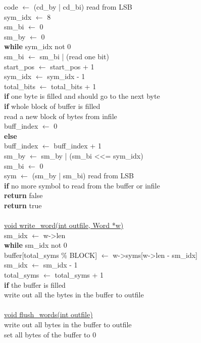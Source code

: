 \documentclass[12pt]{article}
\begin{document}
\indent *code $\leftarrow$ (cd\_by | cd\_bi) read from LSB \\
\indent sym\_idx $\leftarrow$ 8 \\
\indent sm\_bi $\leftarrow$ 0 \\
\indent sm\_by $\leftarrow$ 0 \\
\indent \textbf{while} sym\_idx not 0 \\
\indent \indent sm\_bi $\leftarrow$ sm\_bi | (read one bit) \\
\indent \indent start\_pos $\leftarrow$ start\_pos + 1 \\
\indent \indent sym\_idx $\leftarrow$ sym\_idx - 1 \\
\indent \indent total\_bits $\leftarrow$ total\_bits + 1 \\
\indent \indent \textbf{if} one byte is filled and should go to the next byte \\
\indent \indent \indent \textbf{if} whole block of buffer is filled \\
\indent \indent \indent \indent read a new block of bytes from infile \\
\indent \indent \indent \indent buff\_index $\leftarrow$ 0 \\
\indent \indent \indent \textbf{else} \\
\indent \indent \indent \indent buff\_index $\leftarrow$ buff\_index + 1 \\
\indent \indent \indent sm\_by $\leftarrow$ sm\_by | (sm\_bi <<= sym\_idx) \\
\indent \indent \indent sm\_bi $\leftarrow$ 0 \\
\indent *sym $\leftarrow$ (sm\_by | sm\_bi) read from LSB \\
\indent \textbf{if} no more symbol to read from the buffer or infile \\
\indent \indent \textbf{return} false \\
\indent \textbf{return} true \\
\\
\underline{void write\_word(int outfile, Word *w)} \\
\indent sm\_idx $\leftarrow$ w->len \\
\indent \textbf{while} sm\_idx not 0 \\
\indent \indent buffer[total\_syms \% BLOCK] $\leftarrow$ w->syms[w->len - sm\_idx] \\
\indent \indent sm\_idx $\leftarrow$ sm\_idx - 1 \\
\indent \indent total\_syms $\leftarrow$ total\_syms + 1 \\
\indent \textbf{if} the buffer is filled \\
\indent \indent write out all the bytes in the buffer to outfile \\
\\
\underline{void flush\_words(int outfile)} \\
\indent write out all bytes in the buffer to outfile \\
\indent set all bytes of the buffer to 0 \\
\\
\end{document}
